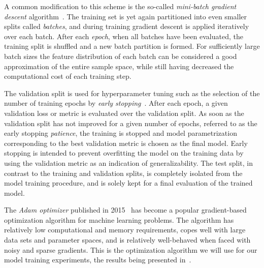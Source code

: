 A common modification to this scheme is the so-called \textit{mini-batch gradient descent} algorithm~\cite{gradient-descent}.
The training set is yet again partitioned into even smaller splits called \textit{batches}, and during training gradient descent is applied iteratively over each batch.
After each \textit{epoch}, when all batches have been evaluated, the training split is shuffled and a new batch partition is formed.
For sufficiently large batch sizes the feature distribution of each batch can be considered a good approximation of the entire sample space, while still having decreased the computational cost of each training step.

The validation split is used for hyperparameter tuning such as the selection of the number of training epochs by \textit{early stopping}~\cite{early-stopping}.
After each epoch, a given validation loss or metric is evaluated over the validation split.
As soon as the validation split has not improved for a given number of epochs, referred to as the early stopping \textit{patience}, the training is stopped and model parametrization corresponding to the best validation metric is chosen as the final model.
Early stopping is intended to prevent overfitting the model on the training data by using the validation metric as an indication of generalizability.
The test split, in contrast to the training and validation splits, is completely isolated from the model training procedure, and is solely kept for a final evaluation of the trained model.

The \textit{Adam optimizer} published in 2015~\cite{adam-optimizer} has become a popular gradient-based optimization algorithm for machine learning problems.
The algorithm has relatively low computational and memory requirements, copes well with large data sets and parameter spaces, and is relatively well-behaved when faced with noisy and sparse gradients.
This is the optimization algorithm we will use for our model training experiments, the results being presented in~.
